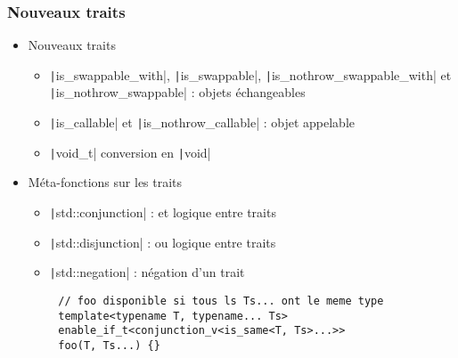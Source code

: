 \documentclass[C++.tex]{subfiles}
\begin{document}
\begin{frame}[fragile]
	\frametitle{Nouveaux traits}
	\begin{itemize}
		\item Nouveaux traits
		\begin{itemize}
			\item \texttt|is_swappable_with|, \texttt|is_swappable|, \texttt|is_nothrow_swappable_with| et \texttt|is_nothrow_swappable| : objets échangeables
			\item \texttt|is_callable| et \texttt|is_nothrow_callable| : objet appelable
			\item \texttt|void_t| conversion en \texttt|void|


		\end{itemize}
		\item Méta-fonctions sur les traits
		\begin{itemize}
			\item \texttt|std::conjunction| : et logique entre traits
			\item \texttt|std::disjunction| : ou logique entre traits
			\item \texttt|std::negation| : négation d'un trait
		\end{itemize}
	\end{itemize}

	\begin{verbatim}
		// foo disponible si tous ls Ts... ont le meme type
		template<typename T, typename... Ts>
		enable_if_t<conjunction_v<is_same<T, Ts>...>>
		foo(T, Ts...) {}
	\end{verbatim}

\end{frame}
\end{document}
